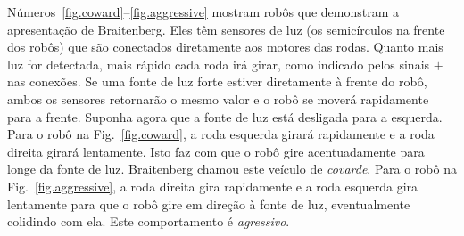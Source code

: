 Números~\ref{fig.coward}--\ref{fig.aggressive} mostram robôs que demonstram a apresentação de Braitenberg. Eles têm sensores de luz (os semicírculos na frente dos robôs) que são conectados diretamente aos motores das rodas. Quanto mais luz for detectada, mais rápido cada roda irá girar, como indicado pelos sinais $+$ nas conexões. Se uma fonte de luz forte estiver diretamente à frente do robô, ambos os sensores retornarão o mesmo valor e o robô se moverá rapidamente para a frente. Suponha agora que a fonte de luz está desligada para a esquerda. Para o robô na Fig.~\ref{fig.coward}, a roda esquerda girará rapidamente e a roda direita girará lentamente. Isto faz com que o robô gire acentuadamente para longe da fonte de luz. Braitenberg chamou este veículo de \emph{covarde}. Para o robô na Fig.~\ref{fig.aggressive}, a roda direita gira rapidamente e a roda esquerda gira lentamente para que o robô gire em direção à fonte de luz, eventualmente colidindo com ela. Este comportamento é \emph{agressivo}.

